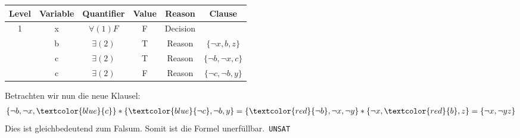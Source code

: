 \begin{center}
	\begin{tabular}{|c|c|c|c|c|c|}
		\hline 
		Level & Variable & Quantifier & Value & Reason & Clause \\ 
		\hline 
		1 & x & $\forall(1)F$ & F & Decision &  \\ 
		\hline 
		& b & $\exists(2)$ & T & Reason & $\{\neg x,b,z\}$ \\ 
		\hline 
		& c & $\exists(2)$ & T & Reason & $\{\neg b, \neg x, c \}$ \\ 
		\hline 
		& c & $\exists(2)$ & F & Reason & $\{\neg c,\neg b, y\}$ \\ 
		\hline 
	\end{tabular}
Betrachten wir nun die neue Klausel:
\begin{align*}
\{\neg b,\neg x, \textcolor{blue}{c} \} \ast \{\textcolor{blue}{\neg c},\neg b, y \} = \{\textcolor{red}{\neg b}, \neg x, \neg y \} \ast \{\neg x,\textcolor{red}{b}, z \} = \{\neg x,\neg y z \}
\end{align*}
Dies ist gleichbedeutend zum Falsum. 
Somit ist die Formel unerfüllbar.\texttt{ UNSAT}
\end{center}